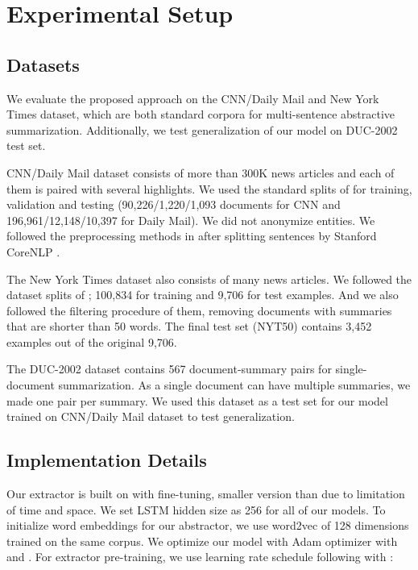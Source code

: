 \documentclass[11pt,a4paper]{article}
\begin{document}
\section{Experimental Setup}

\subsection{Datasets}

We evaluate the proposed approach on the CNN/Daily Mail \cite{NIPS2015_5945} and
New York Times \cite{sandhaus2008nyt} dataset, which are both standard corpora
for multi-sentence abstractive summarization. Additionally, we test
generalization of our model on DUC-2002 test set.

CNN/Daily Mail dataset consists of more than 300K news articles and
each of them is paired with several highlights.
We used the standard splits of \citet{NIPS2015_5945}
for training, validation and testing (90,226/1,220/1,093 documents for CNN and
196,961/12,148/10,397 for Daily Mail). We did not anonymize entities.
We followed the preprocessing methods in \citet{see-etal-2017-get}
after splitting sentences by Stanford CoreNLP \cite{manning-EtAl:2014:P14-5}.

The New York Times dataset also consists of many news articles.
We followed the dataset splits of \citet{durrett-etal-2016-learning};
100,834 for training and 9,706 for test examples.
And we also followed the filtering procedure of them, removing
documents with summaries that are shorter than 50 words.
The final test set (NYT50) contains 3,452 examples out of the original 9,706.

The DUC-2002 dataset contains 567 document-summary pairs
for single-document summarization. As a single document can
have multiple summaries, we made one pair per summary.
We used this dataset as a test set for our model trained on
CNN/Daily Mail dataset to test generalization.

\subsection{Implementation Details}

Our extractor is built on  with fine-tuning, smaller version
than  due to limitation of time and space.
We set LSTM hidden size as 256 for all of our models.
To initialize word embeddings for our abstractor,
we use word2vec \cite{mikolov2013distributed} of 128 dimensions
trained on the same corpus.
We optimize our model with Adam optimizer \cite{DBLP:journals/corr/KingmaB14} with
 and .
For extractor pre-training, we use learning rate schedule following \cite{vaswani2017attention}
with :
\end{document}
